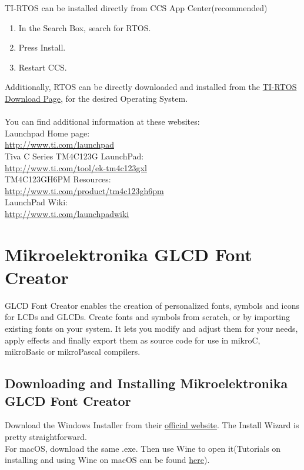 \documentclass[a4paper,12pt,oneside]{book}
\begin{document}
TI-RTOS can be installed directly from CCS App Center(recommended)
\begin{enumerate}
\item In the Search Box, search for RTOS.
\item Press Install.
\item Restart CCS.
\end{enumerate}
Additionally, RTOS can be directly downloaded and installed from the \href{http://software-dl.ti.com/dsps/dsps_public_sw/sdo_sb/targetcontent/tirtos/index.html}{TI-RTOS Download Page}, for the desired Operating System.
\\ \\
You can find additional information at these websites:\\
Launchpad Home page: \\ \href{http://www.ti.com/launchpad}{http://www.ti.com/launchpad}\\
Tiva C Series TM4C123G LaunchPad:\\ \href{http://www.ti.com/tool/ek-tm4c123gxl}{http://www.ti.com/tool/ek-tm4c123gxl} \\
TM4C123GH6PM Resources:\\ \href{http://www.ti.com/product/tm4c123gh6pm}{http://www.ti.com/product/tm4c123gh6pm} \\
LaunchPad Wiki:\\ \href{http://www.ti.com/launchpadwiki}{http://www.ti.com/launchpadwiki}

\section{Mikroelektronika GLCD Font Creator}
\qquad GLCD Font Creator enables the creation of personalized fonts, symbols and icons for LCDs and GLCDs. Create fonts and symbols from scratch, or by importing existing fonts on your system. It lets you modify and adjust them for your needs, apply effects and finally export them as source code for use in mikroC, mikroBasic or mikroPascal compilers.

\subsection{Downloading and Installing Mikroelektronika GLCD Font Creator}
Download the Windows Installer from their \href{https://download.mikroe.com/setups/additional-software/glcd-font-creator/glcd-font-creator-v120.zip}{official website}. The Install Wizard is pretty straightforward. \\
For macOS, download the same .exe. Then use Wine to open it(Tutorials on installing and using Wine on macOS can be found \href{https://www.davidbaumgold.com/tutorials/wine-mac/}{here}). 
\end{document}
